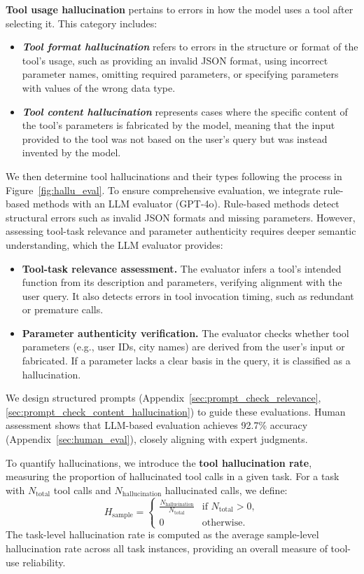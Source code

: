 \textbf{Tool usage hallucination} pertains to errors in how the model uses a tool after selecting it. This category includes:
\begin{itemize}
    \item \textbf{\textit{Tool format hallucination}} refers to errors in the structure or format of the tool’s usage, such as providing an invalid JSON format, using incorrect parameter names, omitting required parameters, or specifying parameters with values of the wrong data type.
    \item \textbf{\textit{Tool content hallucination}} represents cases where the specific content of the tool’s parameters is fabricated by the model, meaning that the input provided to the tool was not based on the user’s query but was instead invented by the model.
\end{itemize}

We then determine tool hallucinations and their types following the process in Figure~\ref{fig:hallu_eval}. To ensure comprehensive evaluation, we integrate rule-based methods with an LLM evaluator (GPT-4o).   Rule-based methods detect structural errors such as invalid JSON formats and missing parameters. However, assessing tool-task relevance and parameter authenticity requires deeper semantic understanding, which the LLM evaluator provides:  
\begin{itemize}
    \item \textbf{Tool-task relevance assessment.} The evaluator infers a tool’s intended function from its description and parameters, verifying alignment with the user query. It also detects errors in tool invocation timing, such as redundant or premature calls.
    \item \textbf{Parameter authenticity verification.} The evaluator checks whether tool parameters (e.g., user IDs, city names) are derived from the user’s input or fabricated. If a parameter lacks a clear basis in the query, it is classified as a hallucination.  
\end{itemize}

We design structured prompts (Appendix~\ref{sec:prompt_check_relevance}, \ref{sec:prompt_check_content_hallucination}) to guide these evaluations. Human assessment shows that LLM-based evaluation achieves 92.7\% accuracy (Appendix~\ref{sec:human_eval}), closely aligning with expert judgments.  

To quantify hallucinations, we introduce the \textbf{tool hallucination rate}, measuring the proportion of hallucinated tool calls in a given task. For a task with \( N_{\text{total}} \) tool calls and \( N_{\text{hallucination}} \) hallucinated calls, we define:  
\begin{equation*}
H_{\text{sample}} = 
\begin{cases} 
\frac{N_{\text{hallucination}}}{N_{\text{total}}} & \text{if } N_{\text{total}} > 0, \\
0 & \text{otherwise.}
\end{cases}
\end{equation*}  
The task-level hallucination rate is computed as the average sample-level hallucination rate across all task instances, providing an overall measure of tool-use reliability.

